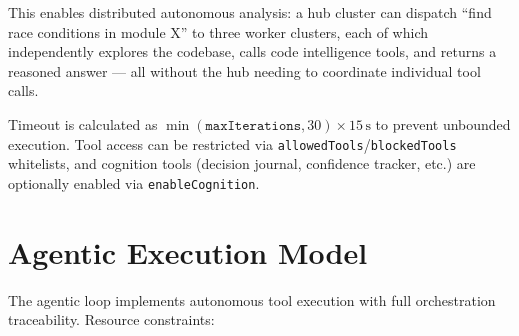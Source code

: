 \documentclass[journal,10pt]{IEEEtran}
\newcommand{\code}[1]{\texttt{#1}}
\begin{document}
This enables distributed autonomous analysis: a hub cluster can dispatch ``find race conditions in module X'' to three worker clusters, each of which independently explores the codebase, calls code intelligence tools, and returns a reasoned answer --- all without the hub needing to coordinate individual tool calls.

Timeout is calculated as $\min(\texttt{maxIterations}, 30) \times 15\,\text{s}$ to prevent unbounded execution. Tool access can be restricted via \code{allowedTools}/\code{blockedTools} whitelists, and cognition tools (decision journal, confidence tracker, etc.) are optionally enabled via \code{enableCognition}.

\section{Agentic Execution Model}
\label{sec:agentic}

The agentic loop implements autonomous tool execution with full orchestration traceability. Resource constraints:
\end{document}
